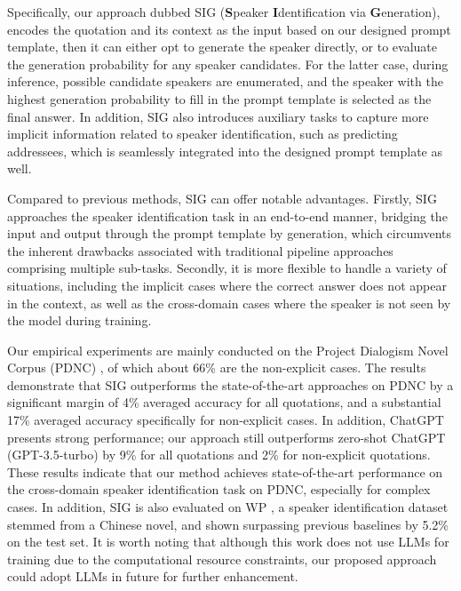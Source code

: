 \documentclass[letterpaper]{article} %
\begin{document}
Specifically, our approach dubbed SIG (\textbf{S}peaker  \textbf{I}dentification via \textbf{G}eneration), encodes the quotation and its context as the input based on our designed prompt template, then it can either opt to generate the speaker directly, or to evaluate the generation probability for any speaker candidates.
For the latter case, during inference, possible candidate speakers are enumerated, and the speaker with the highest generation probability to fill in the prompt template is selected as the final answer.
In addition, SIG also introduces auxiliary tasks to capture more implicit information related to speaker identification, such as predicting addressees, which is seamlessly integrated into the designed prompt template as well.

Compared to previous methods, SIG can offer notable advantages. Firstly, SIG approaches the speaker identification task in an end-to-end manner, bridging the input and output through the prompt template by generation, which circumvents the inherent drawbacks associated with traditional pipeline approaches comprising multiple sub-tasks. Secondly, it is more flexible to handle a variety of situations, including the implicit cases where the correct answer does not appear in the context, as well as the cross-domain cases where the speaker is not seen by the model during training.

Our empirical experiments are mainly conducted on the Project Dialogism Novel Corpus (PDNC) \citep{DBLP:conf/lrec/VishnubhotlaHH22}, of which about 66\% are the non-explicit cases. The results demonstrate that SIG outperforms the state-of-the-art approaches on PDNC by a significant margin of 4\% averaged accuracy for all quotations, and a substantial 17\% averaged accuracy specifically for non-explicit cases. In addition, ChatGPT presents strong performance; our approach still outperforms zero-shot ChatGPT (GPT-3.5-turbo) by 9\% for all quotations and 2\% for non-explicit quotations.
These results indicate that our method achieves state-of-the-art performance on the cross-domain speaker identification task on PDNC, especially for complex cases.
In addition, SIG is also evaluated on WP \cite{chen2019chinese}, a speaker identification dataset stemmed from a Chinese novel, and shown surpassing previous baselines by 5.2\% on the test set.
It is worth noting that although this work does not use LLMs for training due to the computational resource constraints, our proposed approach could adopt LLMs in future for further enhancement.
\end{document}
